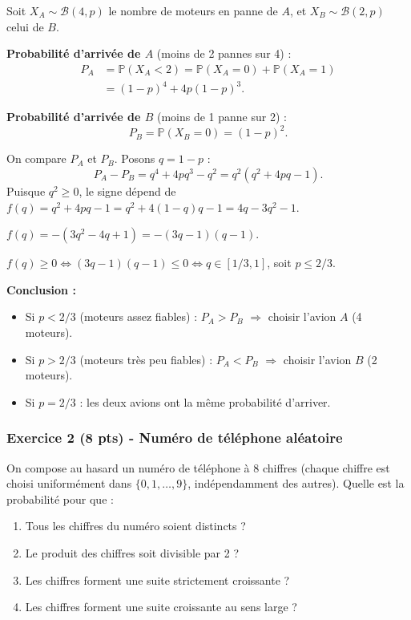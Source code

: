 \documentclass[12pt,a4paper]{article}
\begin{document}
\begin{boitecorrige}
Soit $X_A \sim \mathcal{B}(4,p)$ le nombre de moteurs en panne de $A$, et $X_B \sim \mathcal{B}(2,p)$ celui de $B$.

\textbf{Probabilité d'arrivée de $A$} (moins de 2 pannes sur 4) :
\begin{align*}
P_A &= \mathbb{P}(X_A < 2) = \mathbb{P}(X_A=0) + \mathbb{P}(X_A=1)\\
    &= (1-p)^4 + 4p(1-p)^3.
\end{align*}

\textbf{Probabilité d'arrivée de $B$} (moins de 1 panne sur 2) :
\[
P_B = \mathbb{P}(X_B=0) = (1-p)^2.
\]

On compare $P_A$ et $P_B$. Posons $q = 1-p$ :
\[
P_A - P_B = q^4 + 4pq^3 - q^2 = q^2\!\left(q^2 + 4pq - 1\right).
\]
Puisque $q^2 \geq 0$, le signe dépend de $f(q) = q^2 + 4pq - 1 = q^2 + 4(1-q)q - 1 = 4q - 3q^2 - 1$.

$f(q) = -(3q^2 - 4q + 1) = -(3q-1)(q-1)$.

$f(q) \geq 0 \iff (3q-1)(q-1) \leq 0 \iff q \in [1/3, 1]$, soit $p \leq 2/3$.

\textbf{Conclusion :}
\begin{itemize}[nosep]
  \item Si $p < 2/3$ (moteurs assez fiables) : $P_A > P_B$ $\Rightarrow$ choisir l'avion $A$ (4 moteurs).
  \item Si $p > 2/3$ (moteurs très peu fiables) : $P_A < P_B$ $\Rightarrow$ choisir l'avion $B$ (2 moteurs).
  \item Si $p = 2/3$ : les deux avions ont la même probabilité d'arriver.
\end{itemize}
\end{boitecorrige}

\subsubsection*{Exercice 2 (8 pts) - Numéro de téléphone aléatoire \niveau{\moyen}}

\begin{boiteexercice}
On compose au hasard un numéro de téléphone à 8 chiffres (chaque chiffre est choisi uniformément dans $\{0,1,\ldots,9\}$, indépendamment des autres). Quelle est la probabilité pour que :
\begin{enumerate}
  \item Tous les chiffres du numéro soient distincts ?
  \item Le produit des chiffres soit divisible par 2 ?
  \item Les chiffres forment une suite strictement croissante ?
  \item Les chiffres forment une suite croissante au sens large ?
\end{enumerate}
\end{boiteexercice}
\end{document}
